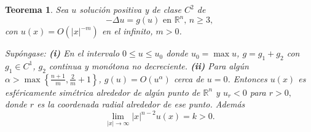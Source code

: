 \documentclass{article}
\newtheorem{theorem}{Teorema}
\begin{document}
\begin{theorem}
Sea $u$ soluci\'{o}n positiva y de clase $C^{2}$ de 
\begin{equation}
-\Delta u=g\left( u\right) \text{ \ \ en }\mathbb{R}^{n}\text{, }n\geq 3, 
\tag{15}
\end{equation}
con $u\left( x\right) =O\left( \left\vert x\right\vert ^{-m}\right) $ en el
infinito, $m>0$.

Sup\'{o}ngase: \textbf{(i)} En el intervalo $0\leq u\leq u_{0}$ donde $%
u_{0}=\max u$, $g=g_{1}+g_{2}$ con $g_{1}\in C^{1}$, $g_{2}$ continua y
mon\'{o}tona no decreciente. \textbf{(ii)} Para alg\'{u}n \linebreak $\alpha
>\max \left\{ \frac{n+1}{m},\frac{2}{m}+1\right\} $, $g\left( u\right)
=O\left( u^{\alpha }\right) $ cerca de $u=0$. Entonces $u\left( x\right) $
es esf\'{e}ricamente sim\'{e}trica alrededor de alg\'{u}n punto de $\mathbb{R%
}^{n}$ y $u_{r}<0$ para $r>0,$ donde $r$ es la coordenada radial alrededor
de ese punto. Adem\'{a}s 
\begin{equation}
\lim_{\left\vert x\right\vert \rightarrow \infty }\left\vert x\right\vert
^{n-2}u\left( x\right) =k>0\text{.}  \tag{16}
\end{equation}
\end{theorem}
\end{document}
